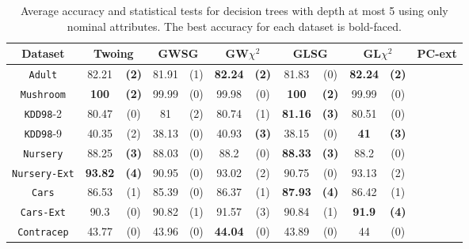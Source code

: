 \begin{table*}[t]
\small
\centering
\caption{Average accuracy and statistical tests  for  decision trees 
with depth at most 5 using only nominal attributes. The best accuracy for each dataset is bold-faced.}
\begin{tabular}{c|cc|cc|cc|cc|cc|cc} 
Dataset & \multicolumn{2}{c|}{Twoing} &  \multicolumn{2}{c|}{GWSG}  
&   \multicolumn{2}{c|}{GW$\chi^2$}                   &\multicolumn{2}{c|}{GLSG}       &\multicolumn{2}{c|}{GL$\chi^2$} & \multicolumn{2}{c}{PC-ext}\\  \hline 
{\tt Adult}         & 82.21    &{\bf(2)}& 81.91    & (1)    &{\bf82.24}&{\bf(2)}& 81.83    & (0)    &{\bf82.24}&{\bf(2)}&          &        \\
{\tt Mushroom}      & {\bf 100}&{\bf(2)}& 99.99    & (0)    & 99.98    & (0)    &{\bf  100}&{\bf(2)}& 99.99    & (0)    &          &        \\
{\tt KDD98}-2       & 80.47    & (0)    & 81       & (2)    & 80.74    & (1)    &{\bf81.16}&{\bf(3)}& 80.51    & (0)    &          &        \\
{\tt KDD98}-9       & 40.35    & (2)    & 38.13    & (0)    & 40.93    &{\bf(3)}& 38.15    & (0)    &{\bf 41 } &{\bf(3)}&          &        \\
{\tt Nursery}       & 88.25    &{\bf(3)}& 88.03    & (0)    & 88.2     & (0)    &{\bf88.33}&{\bf(3)}& 88.2     & (0)    &          &        \\
{\tt Nursery-Ext}   &{\bf93.82}&{\bf(4)}& 90.95    & (0)    & 93.02    & (2)    & 90.75    & (0)    & 93.13    & (2)    &          &        \\
{\tt Cars}          & 86.53    & (1)    & 85.39    & (0)    & 86.37    & (1)    &{\bf87.93}&{\bf(4)}& 86.42    & (1)    &          &        \\
{\tt Cars-Ext}      & 90.3     & (0)    & 90.82    & (1)    & 91.57    & (3)    & 90.84    & (1)    &{\bf 91.9}&{\bf(4)}&          &        \\
{\tt Contracep}     & 43.77    & (0)    & 43.96    & (0)    &{\bf44.04}& (0)    & 43.89    & (0)    & 44       & (0)    &          &        \\

\end{tabular}
\end{table*}
